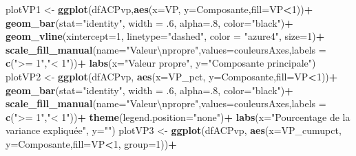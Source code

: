 \documentclass[
  11pt,
  french,
]{book}
\makeatletter
\newenvironment{Shaded}{\begin{snugshade}}{\end{snugshade}}
\newcommand{\CharTok}[1]{\textcolor[rgb]{0.31,0.60,0.02}{#1}}
\newcommand{\DataTypeTok}[1]{\textcolor[rgb]{0.13,0.29,0.53}{#1}}
\newcommand{\DecValTok}[1]{\textcolor[rgb]{0.00,0.00,0.81}{#1}}
\newcommand{\FloatTok}[1]{\textcolor[rgb]{0.00,0.00,0.81}{#1}}
\newcommand{\KeywordTok}[1]{\textcolor[rgb]{0.13,0.29,0.53}{\textbf{#1}}}
\newcommand{\NormalTok}[1]{#1}
\newcommand{\OperatorTok}[1]{\textcolor[rgb]{0.81,0.36,0.00}{\textbf{#1}}}
\newcommand{\StringTok}[1]{\textcolor[rgb]{0.31,0.60,0.02}{#1}}
\newenvironment{kframe}{%
\medskip{}
\setlength{\fboxsep}{.8em}
 \def\at@end@of@kframe{}%
 \ifinner\ifhmode%
  \def\at@end@of@kframe{\end{minipage}}%
  \begin{minipage}{\columnwidth}%
 \fi\fi%
 \def\FrameCommand##1{\hskip\@totalleftmargin \hskip-\fboxsep
 \colorbox{shadecolor}{##1}\hskip-\fboxsep
     \hskip-\linewidth \hskip-\@totalleftmargin \hskip\columnwidth}%
 \MakeFramed {\advance\hsize-\width
   \@totalleftmargin\z@ \linewidth\hsize
   \@setminipage}}%
 {\par\unskip\endMakeFramed%
 \at@end@of@kframe}
\renewenvironment{Shaded}{\begin{kframe}}{\end{kframe}}
\makeatother
\begin{document}
\begin{Shaded}
\begin{Highlighting}[]
\NormalTok{plotVP1 <-}\StringTok{ }\KeywordTok{ggplot}\NormalTok{(dfACPvp,}\KeywordTok{aes}\NormalTok{(}\DataTypeTok{x=}\NormalTok{VP, }\DataTypeTok{y=}\NormalTok{Composante,}\DataTypeTok{fill=}\NormalTok{VP}\OperatorTok{<}\DecValTok{1}\NormalTok{))}\OperatorTok{+}
\StringTok{  }\KeywordTok{geom_bar}\NormalTok{(}\DataTypeTok{stat=}\StringTok{"identity"}\NormalTok{, }\DataTypeTok{width =} \FloatTok{.6}\NormalTok{, }\DataTypeTok{alpha=}\NormalTok{.}\DecValTok{8}\NormalTok{, }\DataTypeTok{color=}\StringTok{"black"}\NormalTok{)}\OperatorTok{+}
\StringTok{  }\KeywordTok{geom_vline}\NormalTok{(}\DataTypeTok{xintercept=}\DecValTok{1}\NormalTok{, }\DataTypeTok{linetype=}\StringTok{"dashed"}\NormalTok{, }\DataTypeTok{color =} \StringTok{"azure4"}\NormalTok{, }\DataTypeTok{size=}\DecValTok{1}\NormalTok{)}\OperatorTok{+}
\StringTok{  }\KeywordTok{scale_fill_manual}\NormalTok{(}\DataTypeTok{name=}\StringTok{"Valeur}\CharTok{\textbackslash{}n}\StringTok{propre"}\NormalTok{,}\DataTypeTok{values=}\NormalTok{couleursAxes,}\DataTypeTok{labels =} \KeywordTok{c}\NormalTok{(}\StringTok{">= 1"}\NormalTok{,}\StringTok{"< 1"}\NormalTok{))}\OperatorTok{+}
\StringTok{  }\KeywordTok{labs}\NormalTok{(}\DataTypeTok{x=}\StringTok{"Valeur propre"}\NormalTok{, }\DataTypeTok{y=}\StringTok{"Composante principale"}\NormalTok{)}
\NormalTok{plotVP2 <-}\StringTok{ }\KeywordTok{ggplot}\NormalTok{(dfACPvp, }\KeywordTok{aes}\NormalTok{(}\DataTypeTok{x=}\NormalTok{VP_pct, }\DataTypeTok{y=}\NormalTok{Composante,}\DataTypeTok{fill=}\NormalTok{VP}\OperatorTok{<}\DecValTok{1}\NormalTok{))}\OperatorTok{+}
\StringTok{  }\KeywordTok{geom_bar}\NormalTok{(}\DataTypeTok{stat=}\StringTok{"identity"}\NormalTok{, }\DataTypeTok{width =} \FloatTok{.6}\NormalTok{, }\DataTypeTok{alpha=}\NormalTok{.}\DecValTok{8}\NormalTok{, }\DataTypeTok{color=}\StringTok{"black"}\NormalTok{)}\OperatorTok{+}
\StringTok{  }\KeywordTok{scale_fill_manual}\NormalTok{(}\DataTypeTok{name=}\StringTok{"Valeur}\CharTok{\textbackslash{}n}\StringTok{propre"}\NormalTok{,}\DataTypeTok{values=}\NormalTok{couleursAxes,}\DataTypeTok{labels =} \KeywordTok{c}\NormalTok{(}\StringTok{">= 1"}\NormalTok{,}\StringTok{"< 1"}\NormalTok{))}\OperatorTok{+}
\StringTok{  }\KeywordTok{theme}\NormalTok{(}\DataTypeTok{legend.position=}\StringTok{"none"}\NormalTok{)}\OperatorTok{+}
\StringTok{  }\KeywordTok{labs}\NormalTok{(}\DataTypeTok{x=}\StringTok{"Pourcentage de la variance expliquée"}\NormalTok{, }\DataTypeTok{y=}\StringTok{""}\NormalTok{)}
\NormalTok{plotVP3 <-}\StringTok{ }\KeywordTok{ggplot}\NormalTok{(dfACPvp, }\KeywordTok{aes}\NormalTok{(}\DataTypeTok{x=}\NormalTok{VP_cumupct, }\DataTypeTok{y=}\NormalTok{Composante,}\DataTypeTok{fill=}\NormalTok{VP}\OperatorTok{<}\DecValTok{1}\NormalTok{, }\DataTypeTok{group=}\DecValTok{1}\NormalTok{))}\OperatorTok{+}

\end{Highlighting}
\end{Shaded}
\end{document}
